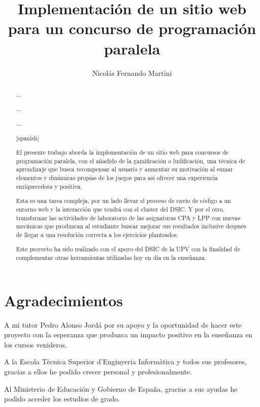 \documentclass[11pt,spanish,listoffigures,listoftables]{tfgetsinf}
\title{Implementación de un sitio web para un concurso de programación paralela}
\author{Nicolás Fernando Martini}
\newenvironment{dedication}
{%
	\thispagestyle{empty}%
	\itshape             %
}
{\par %
	\vspace{\stretch{3}} %
	\clearpage           %
}
\begin{document}
	

\begin{dedication}	
	
	\chapter*{Agradecimientos}
		A mi tutor Pedro Alonso Jordá por su apoyo y la oportunidad de hacer este proyecto con la esperanza que produzca un impacto positivo en la enseñanza en los cursos venideros. \par
		A la Escola Tècnica Superior d'Enginyeria Informàtica y todos sus profesores, gracias a ellos he podido crecer personal y profesionalmente. \par
		Al Ministerio de Educación y Gobierno de España, gracias a sus ayudas he podido acceder los estudios de grado.
		
\end{dedication}

\begin{abstract}

... \par

... \par

... \par

\end{abstract}

\begin{abstract}[spanish]
	
El presente trabajo aborda la implementación de un sitio web para concursos de programación paralela, con el añadido de la gamificación o ludificación, una técnica de aprendizaje que busca recompensar al usuario y aumentar su motivación al sumar elementos y dinámicas propias de los juegos para así ofrecer una experiencia enriquecedora y positiva. \par 

Esta es una tarea compleja, por un lado llevar el proceso de envío de código a un entorno web y la interacción que tendrá con el cluster \kahan del DSIC. Y por el otro, transformar las actividades de laboratorio de las asignaturas CPA y LPP con nuevas mecánicas que produzcan al estudiante buscar mejorar sus resultados inclusive después de llegar a una resolución correcta a los ejercicios planteados. \par

Este proyecto ha sido realizado con el apoyo del DSIC de la UPV con la finalidad de complementar otras herramientas utilizadas hoy en día en la enseñanza. \par

\end{abstract}
\end{document}
